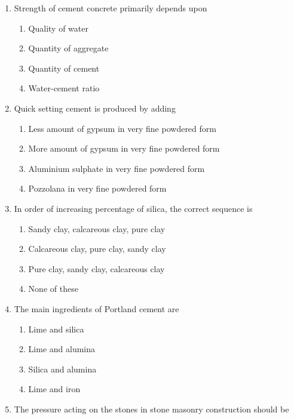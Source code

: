 \documentclass[11pt,a4paper]{article}
\begin{document}
\begin{enumerate}
\\
\item{Strength of cement concrete primarily depends upon}
\begin{enumerate}[label=\Alph*.]
\item{Quality of water}
\item{Quantity of aggregate}
\item{Quantity of cement}
\item{Water-cement ratio}
\end{enumerate}
\item{Quick setting cement is produced by adding}
\begin{enumerate}[label=\Alph*.]
\item{Less amount of gypsum in very fine powdered form}
\item{More amount of gypsum in very fine powdered form}
\item{Aluminium sulphate in very fine powdered form}
\item{Pozzolana in very fine powdered form}
\end{enumerate}
\item{In order of increasing percentage of silica, the correct sequence is}
\begin{enumerate}[label=\Alph*.]
\item{Sandy clay, calcareous clay, pure clay}
\item{Calcareous clay, pure clay, sandy clay}
\item{Pure clay, sandy clay, calcareous clay}
\item{None of these}
\end{enumerate}
\item{The main ingredients of Portland cement are}
\begin{enumerate}[label=\Alph*.]
\item{Lime and silica}
\item{Lime and alumina}
\item{Silica and alumina}
\item{Lime and iron}
\end{enumerate}
\item{The pressure acting on the stones in stone masonry construction should be}

\end{enumerate}
\end{document}

